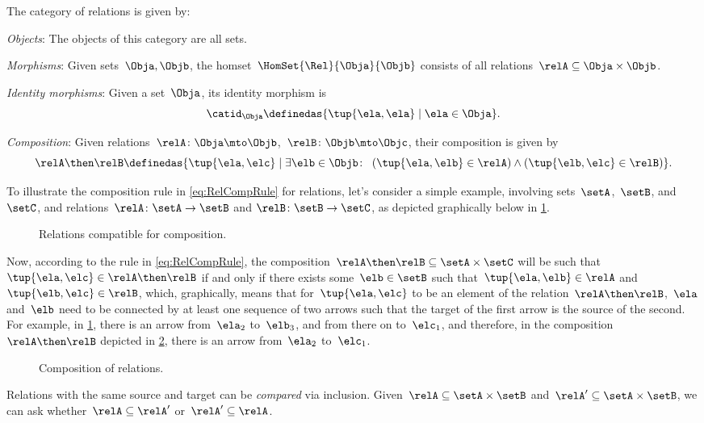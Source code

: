 \begin{ctdefinition}
  \label{def:Rel}
  The category of relations \iindex{\Rel}  is given by:
  \begin{compactenum}
    \item \emph{Objects}: The objects of this category are all sets.
    \item \emph{Morphisms}: Given sets~$\Obja, \Objb$, the homset~$\HomSet{\Rel}{\Obja}{\Objb}$ consists of all
    relations~$\relA\subseteq \Obja\times \Objb$.
    \item \emph{Identity morphisms}: Given a set~$\Obja$, its identity morphism is
    \begin{equation}
      \catid_\Obja \definedas \{ \tup{\ela,\ela} \mid  \ela \in \Obja \}.
    \end{equation}
    \item \emph{Composition}: Given relations~$\relA \colon \Obja\mto \Objb$,~$\relB \colon \Objb\mto \Objc$, their composition is given by
    \begin{equation}
      \label{eq:RelCompRule}
      \relA \then \relB \definedas \{\tup{\ela,\elc} \mid  \exists \elb \in \Objb \colon \ \left(\tup{\ela,\elb} \in \relA\right) \wedge \left(\tup{\elb,\elc} \in \relB\right)\}.
    \end{equation}
  \end{compactenum}
\end{ctdefinition}

To illustrate the composition rule in \cref{eq:RelCompRule} for relations, let's consider a simple example, involving sets~$\setA$,~$\setB$, and~$\setC$, and relations~$\relA \colon \setA \to \setB$ and $\relB \colon \setB \to \setC$, as depicted graphically below in \cref{fig:example_rel_composable}.
%
\begin{figure}[h!]
  \centering
  \caption{Relations compatible for composition.}
  \label{fig:example_rel_composable}
\end{figure}
%
Now, according to the rule in \cref{eq:RelCompRule}, the composition~$\relA \then \relB \subseteq \setA \times \setC$ will be such that~$\tup{\ela,\elc} \in \relA \then \relB$ if and only if there exists some~$\elb \in \setB$ such that~$\tup{\ela,\elb} \in \relA$ and~$\tup{\elb,\elc} \in \relB$, which, graphically, means that for~$\tup{\ela,\elc}$ to be an element of the relation~$\relA \then \relB$,~$\ela$ and~$\elb$ need to be connected by at least one sequence of two arrows such that the target of the first arrow is the source of the second.
For example, in \cref{fig:example_rel_composable}, there is an arrow from~$\ela_2$ to~$\elb_3$, and from there on to~$\elc_1$, and therefore, in the composition~$\relA \then \relB$ depicted in \cref{fig:example_rel_composed}, there is an arrow from~$\ela_2$ to~$\elc_1$.
%
\begin{figure}[h!]
  \centering
  \caption{Composition of relations.}
  \label{fig:example_rel_composed}
\end{figure}

\begin{remark}
  Relations with the same source and target can be \emph{compared} via inclusion.
  Given~$\relA \subseteq \setA\times \setB$ and~$\relA'\subseteq \setA\times \setB$, we can ask whether~$\relA\subseteq \relA'$ or~$\relA'\subseteq \relA$.
\end{remark}
